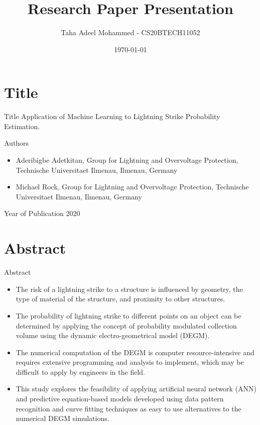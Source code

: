 \documentclass{beamer}
\title{Research Paper Presentation}
\author{Taha Adeel Mohammed - CS20BTECH11052}
\institute{IITH(CSE)}
\date{\today}
\begin{document}
\section{Title}
\begin{frame}
\titlepage
\end{frame}

\begin{frame}%
    \begin{block}{Title}
    Application of Machine Learning to Lightning Strike Probability Estimation.
    \end{block}
    \begin{block}{Authors}
    \begin{itemize}
        \item Aderibigbe Adetkitan, Group for Lightning and Overvoltage Protection, Technische Universitaet Ilmenau, Ilmenau, Germany
        \item Michael Rock, Group for Lightning and Overvoltage Protection, Technische Universitaet Ilmenau, Ilmenau, Germany
    \end{itemize}
    \end{block}
    \begin{block}{Year of Publication}
        2020
    \end{block}
\end{frame}

\section{Abstract}
\begin{frame}{Abstract}
    \begin{itemize}
        \justifying
        \item The risk of a lightning strike to a structure is influenced by geometry, the type of material of the structure, and proximity to other structures.
        \item The probability of lightning strike to different points on an object can be determined by applying the concept of probability modulated collection volume using the dynamic electro-geometrical model (DEGM).
        \item The numerical computation of the DEGM is computer resource-intensive and requires extensive programming and analysis to implement, which may be difficult to apply by engineers in the field.
        \item This study explores the feasibility of applying artificial neural network (ANN) and predictive equation-based models developed using data pattern recognition and curve fitting techniques as easy to use alternatives to the numerical DEGM simulations.
    \end{itemize}
\end{frame}
\end{document}
